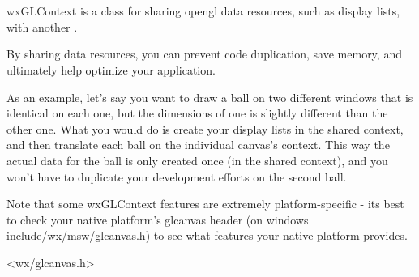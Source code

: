 \section{}\label{wxglcontext}

wxGLContext is a class for sharing opengl data resources, such as display lists, with another .

By sharing data resources, you can prevent code duplication, save memory, and ultimately help optimize your application.

As an example, let's say you want to draw a ball on two different windows that is identical on each one, but the dimensions of one is slightly different than the other one.  What you would do is create your display lists in the shared context, and then translate each ball on the individual canvas's context.  This way the actual data for the ball is only created once (in the shared context), and you won't have to duplicate your development efforts on the second ball.

Note that some wxGLContext features are extremely platform-specific - its best to check your native platform's glcanvas header (on windows include/wx/msw/glcanvas.h) to see what features your native platform provides.




<wx/glcanvas.h>\\
\\ 



\label{wxglcontextconstr}





\label{wxglcontextgetwindow}

